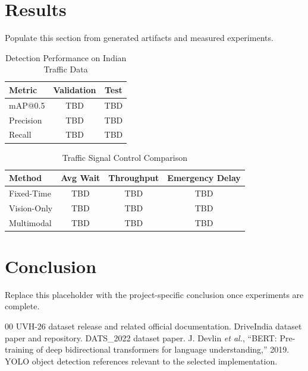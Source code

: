 \documentclass[conference]{IEEEtran}
\begin{document}
\section{Results}
Populate this section from generated artifacts and measured experiments.

\begin{table}[!t]
\caption{Detection Performance on Indian Traffic Data}
\centering
\begin{tabular}{lcc}
\toprule
Metric & Validation & Test \\
\midrule
mAP@0.5 & TBD & TBD \\
Precision & TBD & TBD \\
Recall & TBD & TBD \\
\bottomrule
\end{tabular}
\end{table}

\begin{table}[!t]
\caption{Traffic Signal Control Comparison}
\centering
\begin{tabular}{lccc}
\toprule
Method & Avg Wait & Throughput & Emergency Delay \\
\midrule
Fixed-Time & TBD & TBD & TBD \\
Vision-Only & TBD & TBD & TBD \\
Multimodal & TBD & TBD & TBD \\
\bottomrule
\end{tabular}
\end{table}

\section{Conclusion}
Replace this placeholder with the project-specific conclusion once experiments are complete.


\begin{thebibliography}{00}
 UVH-26 dataset release and related official documentation.
 DriveIndia dataset paper and repository.
 DATS\_2022 dataset paper.
 J. Devlin \emph{et al.}, ``BERT: Pre-training of deep bidirectional transformers for language understanding,'' 2019.
 YOLO object detection references relevant to the selected implementation.
\end{thebibliography}
\end{document}
